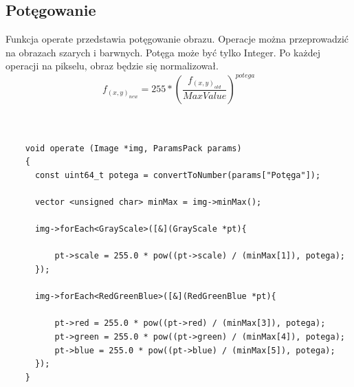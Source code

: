 \documentclass{article}
\begin{document}
\FloatBarrier
\subsection{Potęgowanie}
Funkcja operate przedstawia potęgowanie obrazu. Operacje można przeprowadzić na obrazach szarych i barwnych. Potęga może być tylko Integer. Po każdej operacji na pikselu, obraz będzie się normalizował.
\begin{equation*}
f_(x,y)_{new} = 255*(\frac{f_(x,y)_{old}}{MaxValue})^{potega}
\end{equation*}\\
\begin{Verbatim}[frame=single,label=Potęgowanie (Source Code)]

    void operate (Image *img, ParamsPack params)
    {
      const uint64_t potega = convertToNumber(params["Potęga"]);

      vector <unsigned char> minMax = img->minMax();

      img->forEach<GrayScale>([&](GrayScale *pt){
      
          pt->scale = 255.0 * pow((pt->scale) / (minMax[1]), potega);
      });

      img->forEach<RedGreenBlue>([&](RedGreenBlue *pt){
      
          pt->red = 255.0 * pow((pt->red) / (minMax[3]), potega);
          pt->green = 255.0 * pow((pt->green) / (minMax[4]), potega);
          pt->blue = 255.0 * pow((pt->blue) / (minMax[5]), potega);
      });
    }
    
\end{Verbatim}
\end{document}
